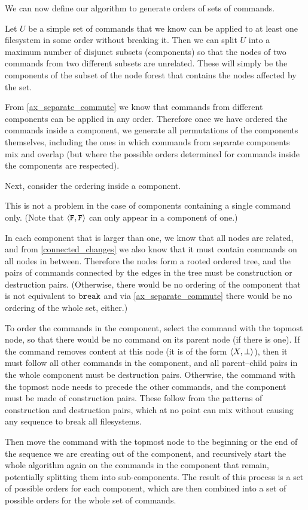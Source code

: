 \medskip

We can now define our algorithm to generate orders of sets of commands.

Let $U$ be a simple set of commands
that we know can be applied to at least one filesystem in some order without breaking it.
Then we can split $U$ into a maximum number of disjunct subsets
(components) so that the nodes of two commands from two different subsets are unrelated.
These will simply be the components of the subset of the node forest that contains the nodes affected by the set.

From \cref{ax_separate_commute} we know that commands from different 
components can be applied in any order.
Therefore once we have ordered the commands inside a component, we generate
all permutations of the components themselves, including the ones
in which commands from separate components mix and overlap
(but where the possible orders determined for commands inside the components are respected).

Next, consider the ordering inside a component.

This is not a problem in the case of components containing a single command only.
(Note that $\langle{\mathtt{F},\mathtt{F}}\rangle$ can only appear in a component of one.)

In each component that is larger than one, 
we know that all nodes are related, and from \cref{connected_changes}
we also know that it must contain commands on all nodes in between.
Therefore the nodes
form a rooted ordered tree,
and the pairs of commands connected by the edges in the tree 
must be construction or destruction pairs.
(Otherwise, there would be no ordering of the component that is not equivalent to $\mathtt{break}$
and via \cref{ax_separate_commute} there would be no ordering of the whole set, either.)

To order the commands in the component,
select the command with the topmost node, so that there would be no command
on its parent node (if there is one). 
If the command removes content at this node (it is of the form $\langle{X,\bot}\rangle$), 
then it must follow all other commands in the component, and
all parent--child pairs in the whole component must be destruction pairs.
Otherwise, the command with the topmost node needs to precede the other commands,
and the component must be made of construction pairs.
These follow from the patterns of construction and destruction pairs, which
at no point can mix without causing any sequence to break all filesystems.

Then move the command with the topmost node to the beginning or the end of
the sequence we are creating out of the component,
and recursively start the whole algorithm again on the commands in the component that remain,
potentially splitting them into sub-components.
The result of this process is a set of possible orders for each component,
which are then combined into a set of possible orders for the whole set of commands.


